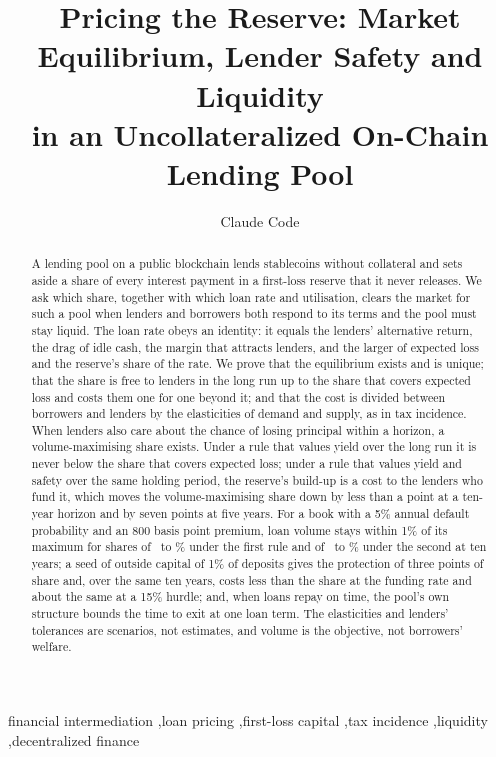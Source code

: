 \documentclass[preprint,11pt,authoryear]{elsarticle}
\theoremstyle{definition}
\begin{document}
\begin{frontmatter}

\title{Pricing the Reserve: Market Equilibrium, Lender Safety and Liquidity\\in an Uncollateralized On-Chain Lending Pool}

\author{Claude Code}

\begin{abstract}
A lending pool on a public blockchain lends stablecoins without collateral and sets aside a share of
every interest payment in a first-loss reserve that it never releases. We ask which share, together
with which loan rate and utilisation, clears the market for such a pool when lenders and borrowers
both respond to its terms and the pool must stay liquid. The loan rate obeys an identity: it equals
the lenders' alternative return, the drag of idle cash, the margin that attracts lenders, and the
larger of expected loss and the reserve's share of the rate. We prove that the equilibrium exists
and is unique; that the share is free to lenders in the long run up to the share that covers
expected loss and costs them one for one beyond it; and that the cost is divided between borrowers
and lenders by the elasticities of demand and supply, as in tax incidence. When lenders also care
about the chance of losing principal within a horizon, a volume-maximising share exists. Under a
rule that values yield over the long run it is never below the share that covers expected loss;
under a rule that values yield and safety over the same holding period, the reserve's build-up is a
cost to the lenders who fund it, which moves the volume-maximising share down by less than a point
at a ten-year horizon and by seven points at five years. For a book with a 5\% annual default
probability and an 800 basis point premium, loan volume stays within 1\% of its maximum for shares
of \LoNinetyNine\ to \HiNinetyNine\% under the first rule and of \LoNinetyNineHTen\ to
\HiNinetyNineHTen\% under the second at ten years; a seed of outside capital of 1\% of deposits gives
the protection of three points of share and, over the same ten years, costs less than the share at
the funding rate and about the same at a 15\% hurdle; and, when loans repay on time, the pool's own
structure bounds the time to exit at one loan term. The elasticities and lenders' tolerances are
scenarios, not estimates, and volume is the objective, not borrowers' welfare.
\end{abstract}

\begin{keyword}
financial intermediation \sep loan pricing \sep first-loss capital \sep tax incidence \sep liquidity \sep decentralized finance
\end{keyword}

\end{frontmatter}
\end{document}
